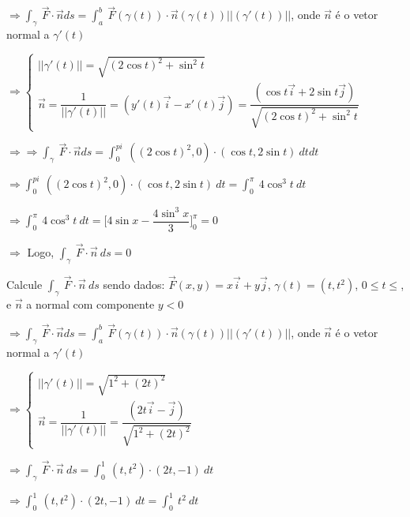 \documentclass[11pt,a4paper]{article}
\begin{document}
\begin{enumerate}
{{		$\Rightarrow \displaystyle\int_\gamma\ \vec{F}\cdot \vec{n}ds = \displaystyle\int_{a}^{b}\ \vec{F}(\gamma(t)) \cdot \vec{n}(\gamma(t)) ||(\gamma'(t))||$, onde $\vec{n}$ é o vetor normal a $\gamma'(t)$
		
		$\Rightarrow \begin{cases}
		||\gamma'(t)|| = \sqrt{(2\cos t)^2 +\sin^2 t}\\
		\vec{n} = \dfrac{1}{||\gamma'(t)||} = (y'(t)\vec{i} - x'(t)\vec{j}) = \dfrac{(\cos t\vec{i} + 2\sin t\vec{j})}{\sqrt{(2\cos t)^2 + \sin^2 t}}
		\end{cases}$
		
		$\Rightarrow \Rightarrow \displaystyle\int_\gamma\ \vec{F}\cdot \vec{n}ds = \displaystyle\int_{0}^{pi}\ ((2\cos t)^2,0) \cdot (\cos t, 2\sin t)\ dt dt$
		
		$\Rightarrow \displaystyle\int_{0}^{pi}\ ((2\cos t)^2,0) \cdot (\cos t, 2\sin t)\ dt = \displaystyle\int_{0}^{\pi}\ 4\cos^3 t\ dt$
		
		$\Rightarrow \displaystyle\int_{0}^{\pi}\ 4\cos^3 t\ dt = \Bigg[4\sin x - \dfrac{4\sin^3 x}{3}\Bigg]_0^{\pi} = 0$
		
		$\Rightarrow$ Logo, $\displaystyle\int_\gamma\ \vec{F} \cdot \vec{n}\ ds = 0$
		
		\item Calcule $\displaystyle\int_\gamma\ \vec{F} \cdot \vec{n}\ ds$ sendo dados: $\vec{F}(x,y) = x\vec{i} + y\vec{j}$, $\gamma(t) = (t,t^2)$, $0 \leq t \leq$, e $\vec{n}$ a normal com componente $y < 0$
		
		$\Rightarrow \displaystyle\int_\gamma\ \vec{F}\cdot \vec{n}ds = \displaystyle\int_{a}^{b}\ \vec{F}(\gamma(t)) \cdot \vec{n}(\gamma(t)) ||(\gamma'(t))||$, onde $\vec{n}$ é o vetor normal a $\gamma'(t)$
		
		$\Rightarrow \begin{cases}
		||\gamma'(t)|| = \sqrt{1^2 + (2t)^2} \\
		\vec{n} = \dfrac{1}{||\gamma'(t)||} = \dfrac{(2t\vec{i} - \vec{j})}{\sqrt{1^2 + (2t)^2}}
		\end{cases}$
		
		$\Rightarrow \displaystyle\int_\gamma\ \vec{F} \cdot \vec{n}\ ds = \displaystyle\int_{0}^{1}\ (t,t^2)\cdot (2t, -1)\ dt$
		
		$\Rightarrow \displaystyle\int_{0}^{1}\ (t,t^2)\cdot (2t, -1)\ dt = \displaystyle\int_{0}^{1}\ t^2\ dt$
		
}}
\end{enumerate}
\end{document}
